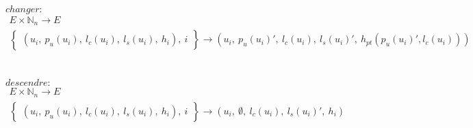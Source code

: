 \documentclass[french]{article}
\begin{document}
\vspace*{0.5cm}
\\
$\displaystyle changer:$
$\displaystyle \begin{matrix}
E\times \mathbb{N}_{n}\rightarrow E\\
\begin{Bmatrix}
( u_{i} ,\ p_{u}( u_{i}) ,\ l_{c}( u_{i}) ,\ l_{s}( u_{i}) ,\ h_{i}) ,\ i
\end{Bmatrix}\rightarrow ( u_{i} ,\ p_{u}( u_{i}) ',\ l_{c}( u_{i}) ,\ l_{s}( u_{i}) ',\ h_{pt}( p_{u}( u_{i}) ',l_{c}( u_{i})))
\end{matrix}$\\
\\
\vspace*{0.5cm}
\\
$\displaystyle descendre:$
$\displaystyle \begin{matrix}
E\times \mathbb{N}_{n}\rightarrow E\\
\begin{Bmatrix}
( u_{i} ,\ p_{u}( u_{i}) ,\ l_{c}( u_{i}) ,\ l_{s}( u_{i}) ,\ h_{i}) ,\ i
\end{Bmatrix}\rightarrow ( u_{i} ,\ \emptyset ,\ l_{c}( u_{i}) ,\ l_{s}( u_{i}) ',\ h_{i})
\end{matrix}$\\
\end{document}
